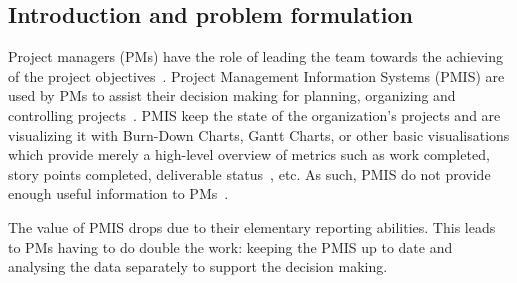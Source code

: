 \documentclass[a4paper, 12pt]{article}
\begin{document}
\subsection{Introduction and problem formulation}


Project managers (PMs) have the role of leading the team towards the achieving of the project objectives~\cite{institute2017guide}. Project Management Information Systems (PMIS) are used by PMs to assist their decision making for planning, organizing and controlling projects~\cite{CANIELS2012162}. PMIS keep the state of the organization's projects and are visualizing it with Burn-Down Charts, Gantt Charts, or other basic visualisations which provide merely a high-level overview of metrics such as work completed, story points completed, deliverable status~\cite{institute2017guide}, etc. As such, PMIS do not provide enough useful information to PMs~\cite{CANIELS2012162}. 

The value of PMIS drops due to their elementary reporting abilities. This leads to PMs having to do double the work: keeping the PMIS up to date and analysing the data separately to support the decision making.



\end{document}
